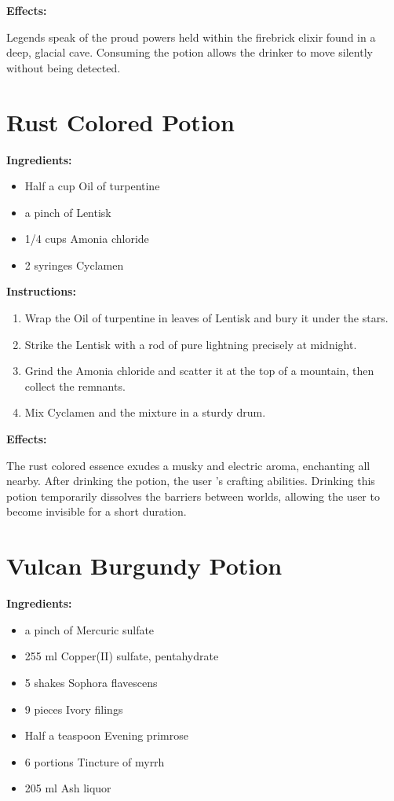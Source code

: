\documentclass{article}
\begin{document}
\textbf{Effects:}

Legends speak of the proud powers held within the firebrick elixir found in a deep, glacial cave. Consuming the potion allows the drinker to move silently without being detected.

\newpage
\section*{Rust Colored Potion}

\textbf{Ingredients:}

\begin{itemize}
  \item Half a cup Oil of turpentine
  \item a pinch of Lentisk
  \item 1/4 cups Amonia chloride
  \item 2 syringes Cyclamen
\end{itemize}

\textbf{Instructions:}

\begin{enumerate}
  \item Wrap the Oil of turpentine in leaves of Lentisk and bury it under the stars.
  \item Strike the Lentisk with a rod of pure lightning precisely at midnight.
  \item Grind the Amonia chloride and scatter it at the top of a mountain, then collect the remnants.
  \item Mix Cyclamen and the mixture in a sturdy drum.
\end{enumerate}

\textbf{Effects:}

The rust colored essence exudes a musky and electric aroma, enchanting all nearby. After drinking the potion, the user 's crafting abilities. Drinking this potion temporarily dissolves the barriers between worlds, allowing the user to become invisible for a short duration.

\newpage
\section*{Vulcan Burgundy Potion}

\textbf{Ingredients:}

\begin{itemize}
  \item a pinch of Mercuric sulfate
  \item 255 ml Copper(II) sulfate, pentahydrate
  \item 5 shakes Sophora flavescens
  \item 9 pieces Ivory filings
  \item Half a teaspoon Evening primrose
  \item 6 portions Tincture of myrrh
  \item 205 ml Ash liquor
\end{itemize}
\end{document}
